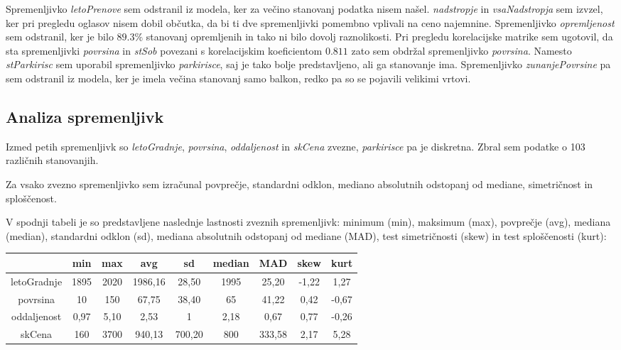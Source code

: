 \documentclass[a4paper, 12pt]{article}
\begin{document}
Spremenljivko \textit{letoPrenove} sem odstranil iz modela, ker za večino
stanovanj podatka nisem našel. \textit{nadstropje} in \textit{vsaNadstropja}
sem izvzel, ker pri pregledu oglasov nisem dobil občutka, da bi ti dve
spremenljivki pomembno vplivali na ceno najemnine. Spremenljivko
\textit{opremljenost} sem odstranil, ker je bilo $ 89.3\% $ stanovanj
opremljenih in tako ni bilo dovolj raznolikosti. Pri pregledu korelacijske
matrike sem ugotovil, da sta spremenljivki \textit{povrsina} in
\textit{stSob} povezani s korelacijskim koeficientom $ 0.811 $ zato sem obdržal
spremenljivko \textit{povrsina}. Namesto \textit{stParkirisc} sem uporabil
spremenljivko \textit{parkirisce}, saj je tako bolje predstavljeno, ali ga
stanovanje ima. Spremenljivko \textit{zunanjePovrsine} pa sem  odstranil iz
modela, ker je imela večina stanovanj samo balkon, redko pa so se pojavili
velikimi vrtovi.

\subsection{Analiza spremenljivk}

Izmed petih spremenljivk so \textit{letoGradnje}, \textit{povrsina},
\textit{oddaljenost} in \textit{skCena} zvezne, \textit{parkirisce} pa je
diskretna. Zbral sem podatke o 103 različnih stanovanjih.

Za vsako zvezno spremenljivko sem izračunal povprečje, standardni odklon,
mediano absolutnih odstopanj od mediane, simetričnost in sploščenost.

V spodnji tabeli je so predstavljene naslednje lastnosti zveznih spremenljivk:
minimum (min), maksimum (max), povprečje (avg), mediana (median), standardni
odklon (sd), mediana absolutnih odstopanj od mediane (MAD), test simetričnosti
(skew) in test sploščenosti (kurt):

\begin{center}
\begin{tabular}{ c|cccccccc }
	& min & max & avg & sd & median & MAD & skew & kurt \\
	\hline
	letoGradnje & 1895 & 2020 & 1986,16 & 28,50 & 1995 & 25,20 & -1,22 & 1,27 \\
	povrsina & 10 & 150 & 67,75 & 38,40 & 65 & 41,22 & 0,42 & -0,67 \\
	oddaljenost & 0,97 & 5,10 & 2,53 & 1 & 2,18 & 0,67 & 0,77 & -0,26 \\
	skCena & 160 & 3700 & 940,13 & 700,20 & 800 & 333,58 & 2,17 & 5,28 \\
\end{tabular}
\end{center}
\end{document}
